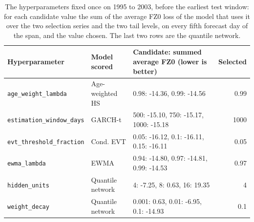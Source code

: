 \begin{table}[htbp]
\centering
\footnotesize
\setlength{\tabcolsep}{3.0pt}
\caption{The hyperparameters fixed once on 1995 to 2003, before the earliest test window: for each candidate value the sum of the average FZ0 loss of the model that uses it over the two selection series and the two tail levels, on every fifth forecast day of the span, and the value chosen. The last two rows are the quantile network.}
\label{tab:market-selection}
\begin{tabular}{llp{6.0cm}r}
\toprule
Hyperparameter & Model scored & Candidate: summed average FZ0 (lower is better) & Selected \\
\midrule
\texttt{age\_weight\_lambda} & Age-weighted HS & 0.98: -14.36, 0.99: -14.56 & 0.99 \\
\texttt{estimation\_window\_days} & GARCH-t & 500: -15.10, 750: -15.17, 1000: -15.18 & 1000 \\
\texttt{evt\_threshold\_fraction} & Cond. EVT & 0.05: -16.12, 0.1: -16.11, 0.15: -16.11 & 0.05 \\
\texttt{ewma\_lambda} & EWMA & 0.94: -14.80, 0.97: -14.81, 0.99: -14.53 & 0.97 \\
\texttt{hidden\_units} & Quantile network & 4: -7.25, 8: 0.63, 16: 19.35 & 4 \\
\texttt{weight\_decay} & Quantile network & 0.001: 0.63, 0.01: -6.95, 0.1: -14.93 & 0.1 \\
\bottomrule
\end{tabular}
\end{table}
